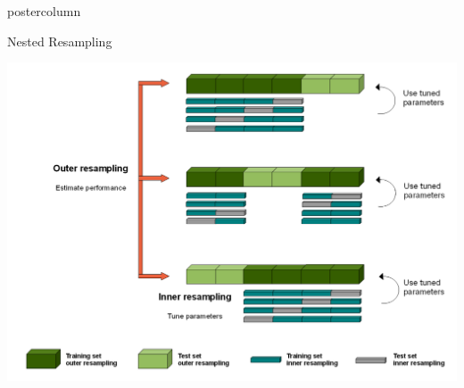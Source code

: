 \documentclass{beamer}
\begin{document}
\begin{frame}[fragile]{}
\begin{columns}
\begin{column}{.31\textwidth}
\begin{beamercolorbox}[center]{postercolumn}
\begin{minipage}{.98\textwidth}
{%
\begin{myblock}{Nested Resampling}

 \begin{center}
             \includegraphics[width=0.9\columnwidth]{img/tuning_2.PNG}
               \end{center}

\end{myblock}

			  }
			\end{minipage}
		\end{beamercolorbox}
	\end{column}
\end{columns}

\end{frame}
\end{document}
